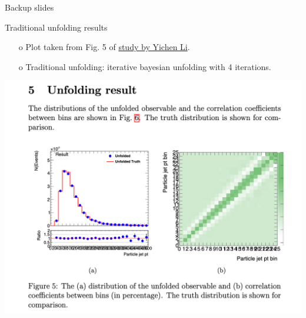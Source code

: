 \begin{frame}{Backup slides}
\end{frame}
\clearpage

\begin{frame}{Traditional unfolding results}
\begin{enumerate}
\item[o] Plot taken from Fig. 5 of \href{http://www.desy.de/~liyichen/Unfolding.pdf}{study by Yichen Li}.
\item[o] Traditional unfolding: iterative bayesian unfolding with 4 iterations.
\end{enumerate}
\centering
\includegraphics[height=0.65\textheight]{./plots/TraditionalUnfolding.png}
\end{frame}
\clearpage
